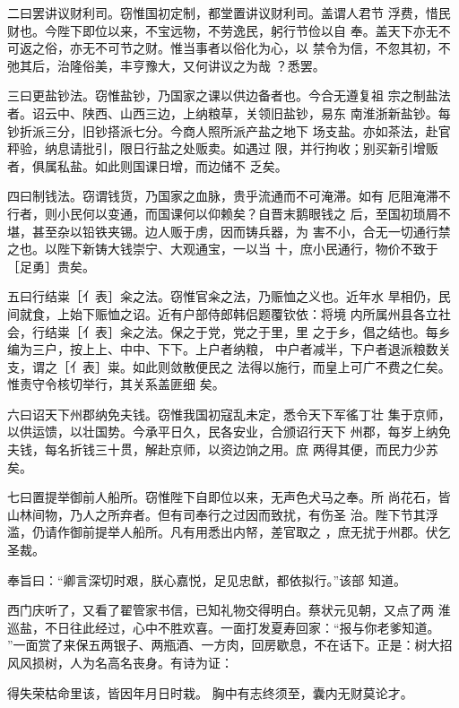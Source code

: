 二曰罢讲议财利司。窃惟国初定制，都堂置讲议财利司。盖谓人君节
浮费，惜民财也。今陛下即位以来，不宝远物，不劳逸民，躬行节俭以自
奉。盖天下亦无不可返之俗，亦无不可节之财。惟当事者以俗化为心，以
禁令为信，不忽其初，不弛其后，治隆俗美，丰亨豫大，又何讲议之为哉
？悉罢。

三曰更盐钞法。窃惟盐钞，乃国家之课以供边备者也。今合无遵复祖
宗之制盐法者。诏云中、陕西、山西三边，上纳粮草，关领旧盐钞，易东
南淮浙新盐钞。每钞折派三分，旧钞搭派七分。今商人照所派产盐之地下
场支盐。亦如茶法，赴官秤验，纳息请批引，限日行盐之处贩卖。如遇过
限，并行拘收；别买新引增贩者，俱属私盐。如此则国课日增，而边储不
乏矣。

四曰制钱法。窃谓钱货，乃国家之血脉，贵乎流通而不可淹滞。如有
厄阻淹滞不行者，则小民何以变通，而国课何以仰赖矣？自晋末鹅眼钱之
后，至国初琐屑不堪，甚至杂以铅铁夹锡。边人贩于虏，因而铸兵器，为
害不小，合无一切通行禁之也。以陛下新铸大钱崇宁、大观通宝，一以当
十，庶小民通行，物价不致于［足勇］贵矣。

五曰行结粜［亻表］籴之法。窃惟官籴之法，乃赈恤之义也。近年水
旱相仍，民间就食，上始下赈恤之诏。近有户部侍郎韩侣题覆钦依：将境
内所属州县各立社会，行结粜［亻表］籴之法。保之于党，党之于里，里
之于乡，倡之结也。每乡编为三户，按上上、中中、下下。上户者纳粮，
中户者减半，下户者退派粮数关支，谓之［亻表］粜。如此则敛散便民之
法得以施行，而皇上可广不费之仁矣。惟责守令核切举行，其关系盖匪细
矣。

六曰诏天下州郡纳免夫钱。窃惟我国初寇乱未定，悉令天下军徭丁壮
集于京师，以供运馈，以壮国势。今承平日久，民各安业，合颁诏行天下
州郡，每岁上纳免夫钱，每名折钱三十贯，解赴京师，以资边饷之用。庶
两得其便，而民力少苏矣。

七曰置提举御前人船所。窃惟陛下自即位以来，无声色犬马之奉。所
尚花石，皆山林间物，乃人之所弃者。但有司奉行之过因而致扰，有伤圣
治。陛下节其浮滥，仍请作御前提举人船所。凡有用悉出内帑，差官取之
，庶无扰于州郡。伏乞圣裁。

奉旨曰：“卿言深切时艰，朕心嘉悦，足见忠猷，都依拟行。”该部
知道。

西门庆听了，又看了翟管家书信，已知礼物交得明白。蔡状元见朝，又点了两
淮巡盐，不日往此经过，心中不胜欢喜。一面打发夏寿回家：“报与你老爹知道。
”一面赏了来保五两银子、两瓶酒、一方肉，回房歇息，不在话下。正是：树大招
风风损树，人为名高名丧身。有诗为证：

得失荣枯命里该，皆因年月日时栽。
胸中有志终须至，囊内无财莫论才。